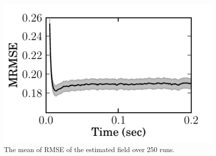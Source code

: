 \documentclass[12pt]{iopart}
\begin{document}
  \begin{figure}
   	\begin{center}
   		\includegraphics{./Graph/MRMSE.pdf} 
   	\end{center}
   	\caption{The mean of RMSE of the estimated field over 250 runs.} 
\label{fig:RMSE}
   \end{figure}
\end{document}
